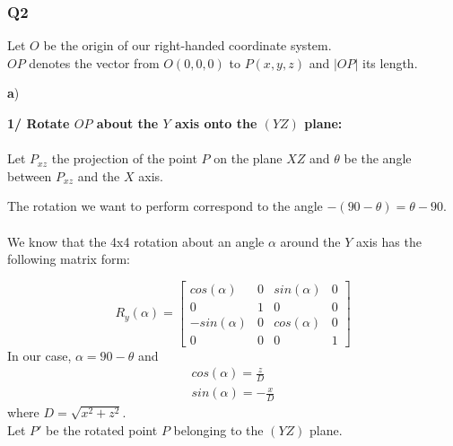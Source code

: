 \documentclass[a4paper,10pt]{article}
\begin{document}
\pagebreak

\subsubsection{Q2}
\bigskip

\noindent
Let $O$ be the origin of our right-handed coordinate system. \\
$OP$ denotes the vector from $O(0, 0, 0)$ to $P(x, y, z)$ and $|OP|$ its length.


\bigskip \noindent
\textbf{a})

\bigskip \noindent
\textbf{1/ Rotate $OP$ about the $Y$ axis onto the $(YZ)$ plane:}\\\\
Let $P_{xz}$ the projection of the point $P$ on the plane $XZ$ and $\theta$ be the angle between $P_{xz}$ and the $X$ axis.

\bigskip \noindent
The rotation we want to perform correspond to the angle $-(90 - \theta) = \theta - 90$. \\\\
We know that the 4x4 rotation about an angle $\alpha$ around the $Y$ axis has the following matrix form:

\begin{equation}
R_y(\alpha) =
\begin{bmatrix}
	cos(\alpha)  & 0 & sin(\alpha) & 0 \\
	0 			 & 1 & 0		   & 0 \\
	-sin(\alpha) & 0 & cos(\alpha) & 0 \\
	0 			 & 0 & 0 		   & 1
\end{bmatrix}
\end{equation}
\noindent
In our case, $\alpha = 90 - \theta$ and
\begin{equation}
\left.\begin{aligned}
	&cos(\alpha) = \frac{z}{D}& \\
	&sin(\alpha) = -\frac{x}{D}&
\end{aligned}\right.
\end{equation}
where $D = \sqrt{x^2 + z^2}$.\\


\noindent
Let $P'$ be the rotated point $P$ belonging to the $(YZ)$ plane.
\end{document}

